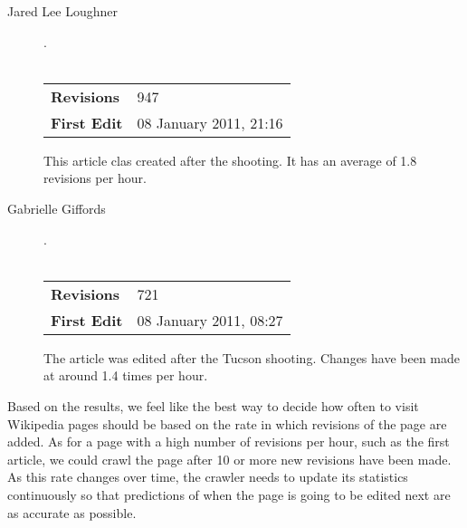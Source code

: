 \documentclass[a4paper,11pt,oneside]{book}
\begin{document}
\begin{enumerate}
\begin{description}
 			\item [Jared Lee Loughner].\\\\
 				\begin{tabular}{| l || l | } \hline
 				  {\bf Revisions} & 947 \\
 				  {\bf First Edit} & 08 January 2011, 21:16 \\ \hline
 				\end{tabular}
	This article clas created after the shooting. It has an average of 1.8 revisions per hour.

 			\item [Gabrielle Giffords]. \\\\
 				\begin{tabular}{| l || l | } \hline
 				  {\bf Revisions} & 721 \\
 				  {\bf First Edit} & 08 January 2011, 08:27  \\	\hline 
 				\end{tabular}
	The article was edited after the Tucson shooting. Changes have been made at around 1.4 times per hour.

		\end{description}

	Based on the results, we feel like the best way to decide how often to visit Wikipedia pages should be based on the rate in which revisions of the page are added. As for a page with a high number of revisions per hour, such as the first article, we could crawl the page after 10 or 
more new revisions have been made. As this rate changes over time, the crawler needs to update its statistics continuously so that predictions of when the page is going to be edited next are as accurate as possible.
 \end {enumerate}






\end{document}
